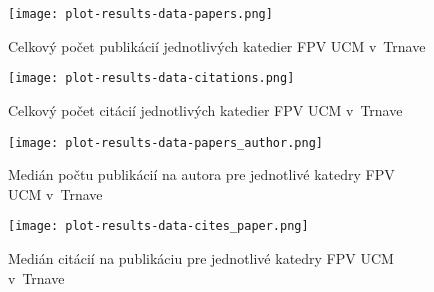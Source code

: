 \begin{figure}
  \centering
  \texttt{[image: plot-results-data-papers.png]}
  \caption{Celkový počet publikácií jednotlivých katedier FPV UCM v~Trnave}
  \label{fig:publications.plot}
\end{figure}

\begin{figure}
  \centering
  \texttt{[image: plot-results-data-citations.png]}
  \caption{Celkový počet citácií jednotlivých katedier FPV UCM v~Trnave}
  \label{fig:citations.plot}
\end{figure}

\begin{figure}
  \centering
  \texttt{[image: plot-results-data-papers\_author.png]}
  \caption{Medián počtu publikácií na autora pre jednotlivé katedry FPV UCM v~Trnave}
  \label{fig:p/a.plot}
\end{figure}


\begin{figure}
  \centering
  \texttt{[image: plot-results-data-cites\_paper.png]}
  \caption{Medián citácií na publikáciu pre jednotlivé katedry FPV UCM v~Trnave}
  \label{fig:c/p.plot}
\end{figure}

